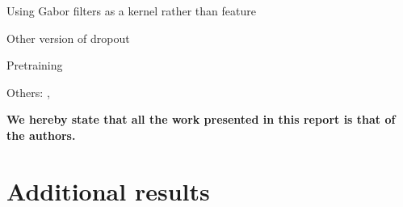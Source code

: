 \documentclass{acm_proc_article-sp}
\begin{document}
Using Gabor filters as a kernel rather than feature \cite{Sabri}

Other version of dropout \cite{Wan}

Pretraining \cite{Erhan}

Others: \cite{Rowley}, \cite{Simard}

{\bfseries We hereby state that all the work presented in this report is that of the authors.}




\appendix
\label{appendix}

\section{Additional results}
\label{sec:additional-results}
\end{document}
